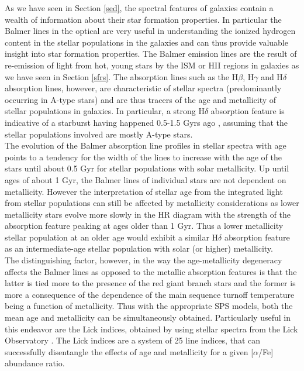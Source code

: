 As we have seen in Section \ref{sed}, the spectral features of galaxies contain a wealth of information about their star formation properties. In particular the Balmer lines in the optical are very useful in understanding the ionized hydrogen content in the stellar populations in the galaxies and can thus provide valuable insight into star formation properties. The Balmer emission lines are the result of re-emission of light from hot, young stars by the ISM or HII regions in galaxies as we have seen in Section \ref{sfrs}. The absorption lines such as the H$\beta$, H$\gamma$ and H$\delta$ absorption lines, however, are characteristic of stellar spectra (predominantly occurring in A-type stars) and are thus tracers of the age and metallicity of stellar populations in galaxies. In particular, a strong H$\delta$ absorption feature is indicative of a starburst having happened 0.5-1.5 Gyrs ago \citep{1983ApJ...270....7D}, assuming that the stellar populations involved are mostly A-type stars.\\

The evolution of the Balmer absorption line profiles in stellar spectra with age points to a tendency for the width of the lines to increase with the age of the stars until about 0.5 Gyr for stellar populations with solar metallicity. Up until ages of about 1 Gyr, the Balmer lines of individual stars are not dependent on metallicity. However the interpretation of stellar age from the integrated light from stellar populations can still be affected by metallicity considerations as lower metallicity stars evolve more slowly in the HR diagram with the strength of the absorption feature peaking at ages older than 1 Gyr. Thus a lower metallicity stellar population at an older age would exhibit a similar H$\delta$ absorption feature as an intermediate-age stellar population with solar (or higher) metallicity.\\

The distinguishing factor, however, in the way the age-metallicity degeneracy affects the Balmer lines as opposed to the metallic absorption features is that the latter is tied more to the presence of the red giant branch stars and the former is more a consequence of the dependence of the main sequence turnoff temperature being a function of metallicity. Thus with the appropriate SPS models, both the mean age and metallicity can be simultaneously obtained. Particularly useful in this endeavor are the Lick indices, obtained by using stellar spectra from the Lick Observatory \citep{1997ApJS..111..377W, worthey_comprehensive_1994}. The Lick indices are a system of 25 line indices, that can successfully disentangle the effects of age and metallicity for a given [$\alpha$/Fe] abundance ratio.\\ 

